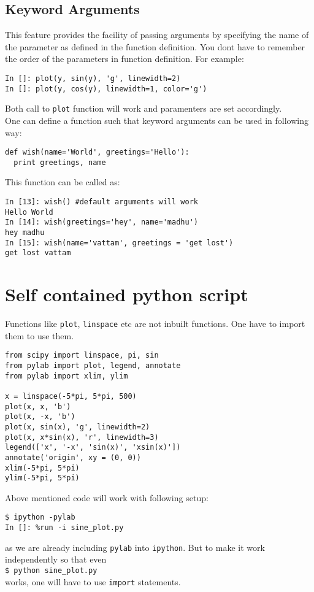 \documentclass[12pt]{article}
\newcommand{\typ}[1]{\lstinline{#1}}
\begin{document}
\subsection{Keyword Arguments}
This feature provides the facility of passing arguments by specifying the name of the parameter as defined in the function definition. You dont have to remember the order of the parameters in function definition. For example:
\begin{lstlisting}
In []: plot(y, sin(y), 'g', linewidth=2)
In []: plot(y, cos(y), linewidth=1, color='g')
\end{lstlisting}
Both call to \typ{plot} function will work and paramenters are set accordingly.\\
One can define a function such that keyword arguments can be used in following way:
\begin{lstlisting}
def wish(name='World', greetings='Hello'):
  print greetings, name
\end{lstlisting}
This function can be called as:
\begin{lstlisting}
In [13]: wish() #default arguments will work
Hello World
In [14]: wish(greetings='hey', name='madhu')
hey madhu
In [15]: wish(name='vattam', greetings = 'get lost')
get lost vattam
\end{lstlisting}
\section{Self contained python script}
Functions like \typ{plot}, \typ{linspace} etc are not inbuilt functions. One have to import them to use them.
  \begin{lstlisting}
from scipy import linspace, pi, sin
from pylab import plot, legend, annotate
from pylab import xlim, ylim

x = linspace(-5*pi, 5*pi, 500)
plot(x, x, 'b')
plot(x, -x, 'b')
plot(x, sin(x), 'g', linewidth=2)
plot(x, x*sin(x), 'r', linewidth=3)
legend(['x', '-x', 'sin(x)', 'xsin(x)'])
annotate('origin', xy = (0, 0))
xlim(-5*pi, 5*pi)
ylim(-5*pi, 5*pi)
  \end{lstlisting}
Above mentioned code will work with following setup:
\begin{lstlisting}
$ ipython -pylab
In []: %run -i sine_plot.py
\end{lstlisting} %
as we are already including \typ{pylab} into \typ{ipython}. But to make it work independently so that even\\
\typ{$ python sine_plot.py} \\ %
works, one will have to use \typ{import} statements.\\
\end{document}
